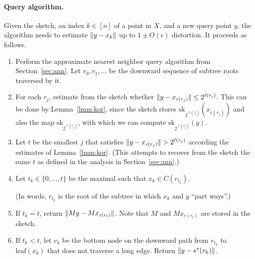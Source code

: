 \paragraph{Query algorithm.}
Given the sketch, an index $k\in[n]$ of a point in $X$, and a new query point $y$, the algorithm needs to estimate $\lVert y-x_k\rVert$ up to $1\pm O(\epsilon)$ distortion. It proceeds as follows.
\begin{enumerate}
  \item Perform the approximate nearest neighbor query algorithm from Section~\ref{sec:ann}. Let $r_0,r_1,\ldots$ be the downward sequence of subtree roots traversed by it.
  \item For each $r_j$, estimate from the sketch whether $\lVert y-x_{c(r_j)}\rVert\leq 2^{\ell(r_j)}$.
  This can be done by Lemma~\ref{lmm:kor}, since the sketch stores $\mathrm{sk}_{2^{\ell(r_j)}}(x_{c(r_j)})$ and also the map $\mathrm{sk}_{2^{\ell(r_j)}}$, with which we can compute $\mathrm{sk}_{2^{\ell(r_j)}}(y)$.
  
   \item Let $t$ be the smallest $j$ that satisfies $\lVert y-x_{c(r_j)}\rVert > 2^{\ell(r_j)}$ according the estimates of Lemma~\ref{lmm:kor}.
  (This attempts to recover from the sketch the same $t$ as defined in the analysis in Section~\ref{sec:ann}.)
  \item Let $t_k\in\{0,\ldots,t\}$ be the maximal such that $x_k\in C(r_{t_k})$.
  
  (In words, $r_{t_k}$ is the root of the subtree in which $x_k$ and $y$ ``part ways''.)
  \item If $t_k=t$, return $\lVert My-Mx_{c(r_t)}\rVert$. Note that $M$ and $Mx_{c(r_t)}$ are stored in the sketch.
  \item If $t_k<t$, let $v_k$ be the bottom node on the downward path from $r_{t_k}$ to $\mathrm{leaf}(x_k)$ that does not traverse a long edge. Return $\lVert y-s^*(v_k)\rVert$.
\end{enumerate}

